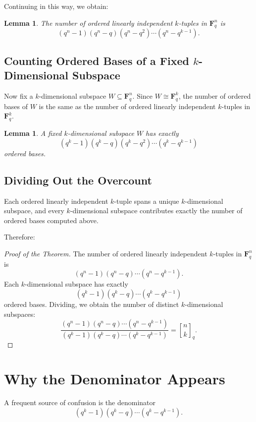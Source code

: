 \documentclass[11pt]{article}
\newtheorem{lemma}[theorem]{Lemma}
\theoremstyle{definition}
\theoremstyle{remark}
\newcommand{\F}{\mathbf{F}}
\newcommand{\qbinom}[2]{\genfrac{[}{]}{0pt}{}{#1}{#2}_q}
\begin{document}
	Continuing in this way, we obtain:
	
	\begin{lemma}
		The number of ordered linearly independent \(k\)-tuples in \(\F_q^n\) is
		\[
		(q^n-1)(q^n-q)(q^n-q^2)\cdots(q^n-q^{k-1}).
		\]
	\end{lemma}
	
	\subsection{Counting Ordered Bases of a Fixed \(k\)-Dimensional Subspace}
	
	Now fix a \(k\)-dimensional subspace \(W\subseteq \F_q^n\). Since \(W\cong \F_q^k\), the number of ordered bases of \(W\) is the same as the number of ordered linearly independent \(k\)-tuples in \(\F_q^k\).
	
	\begin{lemma}
		A fixed \(k\)-dimensional subspace \(W\) has exactly
		\[
		(q^k-1)(q^k-q)(q^k-q^2)\cdots(q^k-q^{k-1})
		\]
		ordered bases.
	\end{lemma}
	
	\subsection{Dividing Out the Overcount}
	
	Each ordered linearly independent \(k\)-tuple spans a unique \(k\)-dimensional subspace, and every \(k\)-dimensional subspace contributes exactly the number of ordered bases computed above.
	
	Therefore:
	
	\begin{proof}[Proof of the Theorem]
		The number of ordered linearly independent \(k\)-tuples in \(\F_q^n\) is
		\[
		(q^n-1)(q^n-q)\cdots(q^n-q^{k-1}).
		\]
		Each \(k\)-dimensional subspace has exactly
		\[
		(q^k-1)(q^k-q)\cdots(q^k-q^{k-1})
		\]
		ordered bases. Dividing, we obtain the number of distinct \(k\)-dimensional subspaces:
		\[
		\frac{(q^n-1)(q^n-q)\cdots(q^n-q^{k-1})}
		{(q^k-1)(q^k-q)\cdots(q^k-q^{k-1})}
		=
		\qbinom{n}{k}.
		\]
	\end{proof}
	
	\section{Why the Denominator Appears}
	
	A frequent source of confusion is the denominator
	\[
	(q^k-1)(q^k-q)\cdots(q^k-q^{k-1}).
	\]
	
\end{document}
